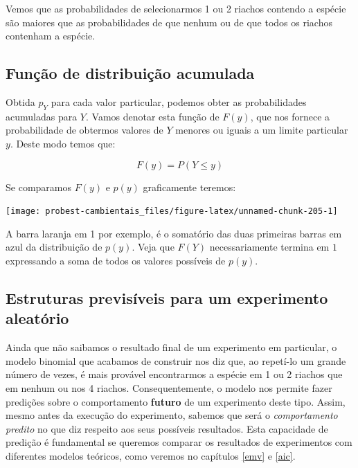\documentclass[
]{book}
\begin{document}
Vemos que as probabilidades de selecionarmos 1 ou 2 riachos contendo a espécie são maiores que as probabilidades de que nenhum ou de que todos os riachos contenham a espécie.

\hypertarget{funuxe7uxe3o-de-distribuiuxe7uxe3o-acumulada}{%
\subsection*{Função de distribuição acumulada}\label{funuxe7uxe3o-de-distribuiuxe7uxe3o-acumulada}}

Obtida \(p_Y\) para cada valor particular, podemos obter as probabilidades acumuladas para \(Y\). Vamos denotar esta função de \(F(y)\), que nos fornece a probabilidade de obtermos valores de \(Y\) menores ou iguais a um limite particular \(y\). Deste modo temos que:

\[F(y) = P(Y \le y)\]

Se comparamos \(F(y)\) e \(p(y)\) graficamente teremos:

\begin{center}\texttt{[image: probest-cambientais\_files/figure-latex/unnamed-chunk-205-1]} \end{center}

A barra laranja em 1 por exemplo, é o somatório das duas primeiras barras em azul da distribuição de \(p(y)\). Veja que \(F(Y)\) necessariamente termina em \(1\) expressando a soma de todos os valores possíveis de \(p(y)\).

\hypertarget{estruturas-previsuxedveis-para-um-experimento-aleatuxf3rio}{%
\subsection*{Estruturas previsíveis para um experimento aleatório}\label{estruturas-previsuxedveis-para-um-experimento-aleatuxf3rio}}

Ainda que não saibamos o resultado final de um experimento em particular, o modelo binomial que acabamos de construir nos diz que, ao repetí-lo um grande número de vezes, é mais provável encontrarmos a espécie em 1 ou 2 riachos que em nenhum ou nos 4 riachos. Consequentemente, o modelo nos permite fazer predições sobre o comportamento \textbf{futuro} de um experimento deste tipo. Assim, mesmo antes da execução do experimento, sabemos que será o \emph{comportamento predito} no que diz respeito aos seus possíveis resultados. Esta capacidade de predição é fundamental se queremos comparar os resultados de experimentos com diferentes modelos teóricos, como veremos no capítulos \ref{emv} e \ref{aic}.
\end{document}
